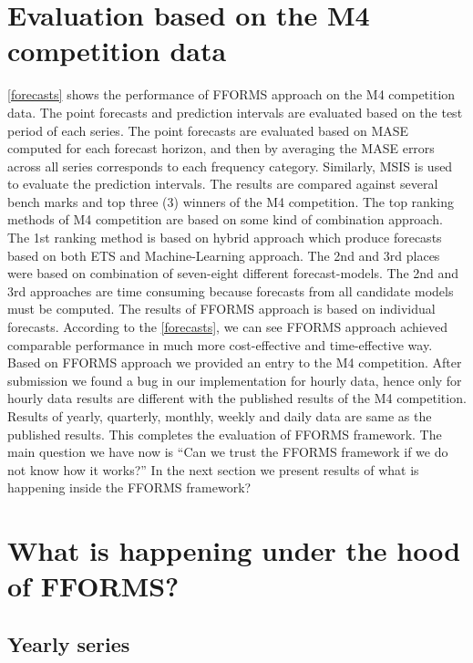\documentclass[11pt,a4paper,]{article}
\begin{document}
\hypertarget{results1}{%
\section{Evaluation based on the M4 competition data}\label{results1}}

\autoref{forecasts} shows the performance of FFORMS approach on the M4 competition data. The point forecasts and prediction intervals are evaluated based on the test period of each series. The point forecasts are evaluated based on MASE computed for each forecast horizon, and then by averaging the MASE errors across all series corresponds to each frequency category. Similarly, MSIS is used to evaluate the prediction intervals. The results are compared against several bench marks and top three (3) winners of the M4 competition. The top ranking methods of M4 competition are based on some kind of combination approach. The 1st ranking method is based on hybrid approach which produce forecasts based on both ETS and Machine-Learning approach. The 2nd and 3rd places were based on combination of seven-eight different forecast-models. The 2nd and 3rd approaches are time consuming because forecasts from all candidate models must be computed. The results of FFORMS approach is based on individual forecasts. According to the \autoref{forecasts}, we can see FFORMS approach achieved comparable performance in much more cost-effective and time-effective way. Based on FFORMS approach we provided an entry to the M4 competition. After submission we found a bug in our implementation for hourly data, hence only for hourly data results are different with the published results of the M4 competition. Results of yearly, quarterly, monthly, weekly and daily data are same as the published results. This completes the evaluation of FFORMS framework. The main question we have now is ``Can we trust the FFORMS framework if we do not know how it works?'' In the next section we present results of what is happening inside the FFORMS framework?

\hypertarget{results2}{%
\section{What is happening under the hood of FFORMS?}\label{results2}}

\hypertarget{yearly-series}{%
\subsection{Yearly series}\label{yearly-series}}
\end{document}
